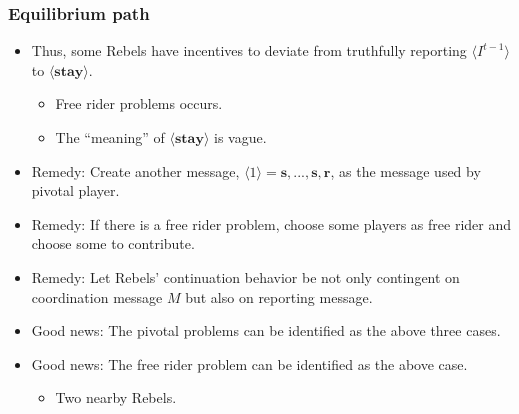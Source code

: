 \documentclass[10pt]{beamer}
\begin{document}
\begin{frame}
\frametitle{Equilibrium path}

\begin{itemize}
\item Thus, some Rebels have incentives to deviate from truthfully reporting $\langle I^{t-1} \rangle$ to $\langle \textbf{stay} \rangle$.
\begin{itemize}
\item Free rider problems occurs.
\item The ``meaning'' of $\langle \textbf{stay} \rangle$ is vague.
\end{itemize}
\item Remedy: Create another message, $\langle 1 \rangle= \textbf{s},...,\textbf{s},\textbf{r}$, as the message used by pivotal player.
\item Remedy: If there is a free rider problem, choose some players as free rider and choose some to contribute. 
\item Remedy: Let Rebels' continuation behavior be not only contingent on coordination message $M$ but also on reporting message.

\item Good news: The pivotal problems can be identified as the above three cases.
\item Good news: The free rider problem can be identified as the above case.
\begin{itemize}
\item Two nearby Rebels.
\end{itemize}

\end{itemize}

\end{frame}
\end{document}
